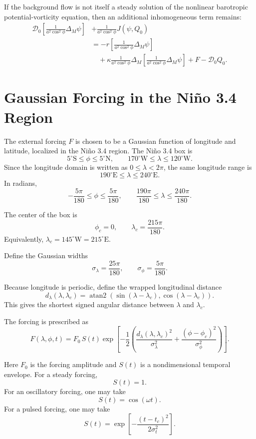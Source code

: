 \documentclass[11pt]{article}
\begin{document}
If the background flow is not itself a steady solution of the nonlinear barotropic
potential-vorticity equation, then an additional inhomogeneous term remains:
\[
\boxed{
\begin{aligned}
\mathcal D_0
\left[
\frac{1}{a^2\cos^2\phi}
\Delta_M\psi
\right]
&+
\frac{1}{a^2\cos^2\phi}
J(\psi,Q_0)
\\
&=
-r
\left[
\frac{1}{a^2\cos^2\phi}
\Delta_M\psi
\right]
\\
&\quad
+
\kappa
\frac{1}{a^2\cos^2\phi}
\Delta_M
\left[
\frac{1}{a^2\cos^2\phi}
\Delta_M\psi
\right]
+
F
-
\mathcal D_0 Q_0 .
\end{aligned}
}
\]

\section{Gaussian Forcing in the Ni\~no 3.4 Region}

The external forcing \(F\) is chosen to be a Gaussian function of longitude
and latitude, localized in the Ni\~no 3.4 region. The Ni\~no 3.4 box is
\[
5^\circ\mathrm{S}\leq \phi \leq 5^\circ\mathrm{N},
\qquad
170^\circ\mathrm{W}\leq \lambda \leq 120^\circ\mathrm{W}.
\]
Since the longitude domain is written as \(0\leq \lambda<2\pi\), the same longitude
range is
\[
190^\circ\mathrm{E}\leq \lambda \leq 240^\circ\mathrm{E}.
\]
In radians,
\[
-\frac{5\pi}{180}\leq \phi \leq \frac{5\pi}{180},
\qquad
\frac{190\pi}{180}\leq \lambda \leq \frac{240\pi}{180}.
\]

The center of the box is
\[
\phi_c=0,
\qquad
\lambda_c=\frac{215\pi}{180}.
\]
Equivalently, \(\lambda_c=145^\circ\mathrm{W}=215^\circ\mathrm{E}\).

Define the Gaussian widths
\[
\sigma_\lambda=\frac{25\pi}{180},
\qquad
\sigma_\phi=\frac{5\pi}{180}.
\]

Because longitude is periodic, define the wrapped longitudinal distance
\[
d_\lambda(\lambda,\lambda_c)
=
\operatorname{atan2}
\left(
\sin(\lambda-\lambda_c),
\cos(\lambda-\lambda_c)
\right).
\]
This gives the shortest signed angular distance between \(\lambda\) and
\(\lambda_c\).

The forcing is prescribed as
\[
\boxed{
F(\lambda,\phi,t)
=
F_0\,S(t)
\exp
\left[
-\frac{1}{2}
\left(
\frac{d_\lambda(\lambda,\lambda_c)^2}{\sigma_\lambda^2}
+
\frac{(\phi-\phi_c)^2}{\sigma_\phi^2}
\right)
\right].
}
\]

Here \(F_0\) is the forcing amplitude and \(S(t)\) is a nondimensional temporal
envelope. For a steady forcing,
\[
S(t)=1.
\]
For an oscillatory forcing, one may take
\[
S(t)=\cos(\omega t).
\]
For a pulsed forcing, one may take
\[
S(t)
=
\exp\left[
-\frac{(t-t_c)^2}{2\sigma_t^2}
\right].
\]
\end{document}
